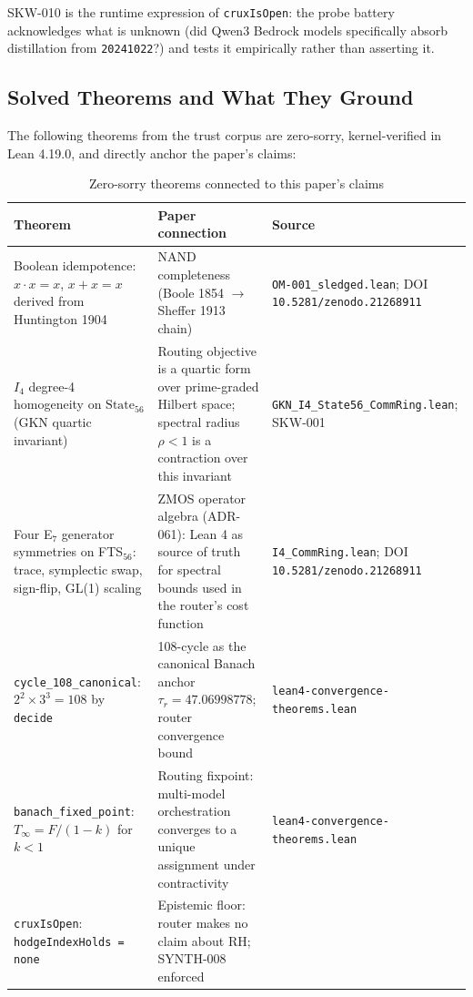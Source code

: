 SKW-010 is the runtime expression of \texttt{cruxIsOpen}: the probe battery
acknowledges what is unknown (did Qwen3 Bedrock models specifically absorb
distillation from \texttt{20241022}?) and tests it empirically rather than
asserting it.

\subsection{Solved Theorems and What They Ground}

The following theorems from the trust corpus are zero-sorry, kernel-verified in
Lean 4.19.0, and directly anchor the paper's claims:

\begin{table}[h]
\centering
\caption{Zero-sorry theorems connected to this paper's claims}
\label{tab:zerp-sorry-theorems}
\begin{tabular}{p{4.5cm}p{4.5cm}p{3.5cm}}
\toprule
\textbf{Theorem} & \textbf{Paper connection} & \textbf{Source} \\
\midrule
Boolean idempotence: $x \cdot x = x$, $x + x = x$ derived from Huntington 1904
& NAND completeness (Boole 1854 $\to$ Sheffer 1913 chain) &
  \texttt{OM-001\_sledged.lean}; DOI \texttt{10.5281/zenodo.21268911} \\
\addlinespace
$I_4$ degree-4 homogeneity on $\text{State}_{56}$ (GKN quartic invariant)
& Routing objective is a quartic form over prime-graded Hilbert space; spectral
  radius $\rho < 1$ is a contraction over this invariant &
  \texttt{GKN\_I4\_State56\_CommRing.lean}; SKW-001 \\
\addlinespace
Four E$_7$ generator symmetries on FTS$_{56}$: trace, symplectic swap,
sign-flip, GL(1) scaling
& ZMOS operator algebra (ADR-061): Lean 4 as source of truth for spectral bounds
  used in the router's cost function &
  \texttt{I4\_CommRing.lean}; DOI \texttt{10.5281/zenodo.21268911} \\
\addlinespace
\texttt{cycle\_108\_canonical}: $2^2 \times 3^3 = 108$ by \texttt{decide}
& 108-cycle as the canonical Banach anchor $\tau_r = 47.06998778$; router
  convergence bound &
  \texttt{lean4-convergence-theorems.lean} \\
\addlinespace
\texttt{banach\_fixed\_point}: $T_\infty = F/(1-k)$ for $k < 1$
& Routing fixpoint: multi-model orchestration converges to a unique
  assignment under contractivity &
  \texttt{lean4-convergence-theorems.lean} \\
\addlinespace
\texttt{cruxIsOpen}: \texttt{hodgeIndexHolds = none}
& Epistemic floor: router makes no claim about RH; SYNTH-008 enforced &

\end{tabular}
\end{table}
